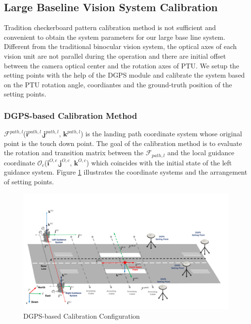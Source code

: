 \documentclass[journal,article,submit,moreauthors,pdftex,10pt,a4paper]{mdpi}
\begin{document}
 

%


\subsection{Large Baseline Vision System Calibration}
Tradition checkerboard pattern calibration method is not sufficient and convenient to obtain the system parameters for our large base line system. Different from the traditional binocular vision system, the optical axes of each vision unit are not parallel during the operation and there are initial offset between the camera optical center and the rotation axes of PTU. We setup the setting points with the help of the DGPS module and calibrate the system based on the PTU rotation angle, coordiantes and the ground-truth position of the setting points.
\subsubsection{DGPS-based Calibration Method}
$\mathcal{F}^{path,l}$($\mathbf{i}^{path,l}$,$\mathbf{j}^{path,l}$, $\mathbf{k}^{path,l}$) is the landing path coordinate system whose original point is the touch down point. The goal of the calibration method is to evaluate the rotation and transition matrix between the $\mathcal{F}_{path,l}$ and the local guidance coordinate $\mathcal{O}_c$($\mathbf{i}^{O,c}$,$\mathbf{j}^{O,c}$, $\mathbf{k}^{O,c}$) which coincides with the initial state of the left guidance system. Figure \ref{fig:10_DGPS_Calibration} illustrates the coordinate systems and the arrangement of setting points.

\begin{figure}[!ht]
	\centering
	\includegraphics[width=\textwidth]{Figs/10_DGPS_Calibration.pdf}	
	\caption{DGPS-based Calibration Configuration}
	\label{fig:10_DGPS_Calibration}
\end{figure}
\end{document}
